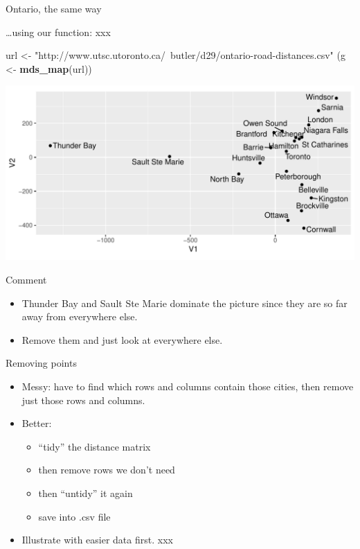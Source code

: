 \documentclass[ignorenonframetext,]{beamer}
\newenvironment{Shaded}{\begin{snugshade}}{\end{snugshade}}
\newcommand{\KeywordTok}[1]{\textcolor[rgb]{0.13,0.29,0.53}{\textbf{#1}}}
\newcommand{\NormalTok}[1]{#1}
\newcommand{\StringTok}[1]{\textcolor[rgb]{0.31,0.60,0.02}{#1}}
\providecommand{\tightlist}{%
  \setlength{\itemsep}{0pt}\setlength{\parskip}{0pt}}
\begin{document}
\begin{frame}[fragile]{Ontario, the same way}
\protect\hypertarget{ontario-the-same-way}{}

\ldots using our function: xxx

\small

\begin{Shaded}
\begin{Highlighting}[]
\NormalTok{url <-}\StringTok{ }
\StringTok{  "http://www.utsc.utoronto.ca/~butler/d29/ontario-road-distances.csv"}
\NormalTok{(g <-}\StringTok{ }\KeywordTok{mds_map}\NormalTok{(url))}
\end{Highlighting}
\end{Shaded}

\includegraphics{figure/unnamed-chunk-22-1.pdf} \normalsize

\end{frame}

\begin{frame}{Comment}
\protect\hypertarget{comment}{}

\begin{itemize}
\tightlist
\item
  Thunder Bay and Sault Ste Marie dominate the picture since they are so
  far away from everywhere else.
\item
  Remove them and just look at everywhere else.
\end{itemize}

\end{frame}

\begin{frame}{Removing points}
\protect\hypertarget{removing-points}{}

\begin{itemize}
\item
  Messy: have to find which rows and columns contain those cities, then
  remove just those rows and columns.
\item
  Better:

  \begin{itemize}
  \item
    ``tidy'' the distance matrix
  \item
    then remove rows we don't need
  \item
    then ``untidy'' it again
  \item
    save into .csv file
  \end{itemize}
\item
  Illustrate with easier data first. xxx
\end{itemize}

\end{frame}
\end{document}
